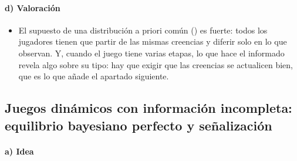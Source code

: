 \documentclass[11pt]{article}
\begin{document}
\paragraph{d) Valoración}

\begin{itemize}
\item El supuesto de una distribución a priori común () es fuerte: todos los jugadores tienen que partir de las mismas creencias y diferir solo en lo que observan. Y, cuando el juego tiene varias etapas, lo que hace el informado revela algo sobre su tipo: hay que exigir que las creencias se actualicen bien, que es lo que añade el apartado siguiente.
\end{itemize}

\subsection{Juegos dinámicos con información incompleta:\cortetitulo{} equilibrio bayesiano perfecto y señalización}\label{sec:ebp-senalizacion}

\paragraph{a) Idea}
\end{document}
